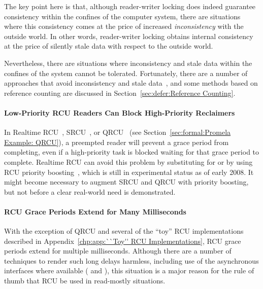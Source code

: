 The key point here is that, although reader-writer locking does
indeed guarantee consistency within the confines of the computer system,
there are situations where this consistency comes at the price of
increased \emph{inconsistency} with the outside world.
In other words, reader-writer locking obtains internal consistency at the
price of silently stale data with respect to the outside world.

Nevertheless, there are situations where inconsistency and stale
data within the confines of the system cannot be tolerated.
Fortunately,
there are a number of approaches that avoid inconsistency and stale
data~\cite{PaulEdwardMcKenneyPhD,Arcangeli03}, and some
methods based on reference counting are discussed in
Section~\ref{sec:defer:Reference Counting}.

\paragraph{Low-Priority RCU Readers Can Block High-Priority Reclaimers}

In Realtime RCU~\cite{DinakarGuniguntala2008IBMSysJ},
SRCU~\cite{PaulEMcKenney2006c}, or
QRCU~\cite{PaulEMcKenney2007QRCUspin} (see
Section~\ref{sec:formal:Promela Example: QRCU}),
a preempted reader will prevent
a grace period from completing, even if a high-priority task is
blocked waiting for that grace period to complete.
Realtime RCU can avoid this problem by substituting 
for  or by using RCU priority
boosting~\cite{PaulEMcKenney2007BoostRCU,DinakarGuniguntala2008IBMSysJ},
which is still in experimental status as of early 2008.
It might become necessary to augment SRCU and QRCU with priority boosting,
but not before a clear real-world need is demonstrated.

\paragraph{RCU Grace Periods Extend for Many Milliseconds}

With the exception of QRCU and several of the ``toy'' RCU implementations
described in
Appendix~\ref{chp:app:``Toy'' RCU Implementations},
RCU grace periods extend for multiple milliseconds.
Although there are a number of techniques to render such long delays
harmless, including use of the asynchronous interfaces where available
( and ), this situation
is a major reason for the rule of thumb that RCU be used in read-mostly
situations.

